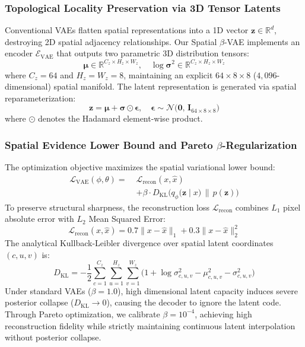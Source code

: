 \documentclass[journal]{IEEEtran}
\begin{document}
\subsubsection{Topological Locality Preservation via 3D Tensor Latents}
Conventional VAEs flatten spatial representations into a 1D vector $\mathbf{z} \in \mathbb{R}^d$, destroying 2D spatial adjacency relationships. Our Spatial $\beta$-VAE implements an encoder $\mathcal{E}_{\text{VAE}}$ that outputs two parametric 3D distribution tensors:
\begin{equation}
\bm{\mu} \in \mathbb{R}^{C_z \times H_z \times W_z}, \quad \log \bm{\sigma}^2 \in \mathbb{R}^{C_z \times H_z \times W_z}
\end{equation}
where $C_z = 64$ and $H_z = W_z = 8$, maintaining an explicit $64 \times 8 \times 8$ ($4,096$-dimensional) spatial manifold. The latent representation is generated via spatial reparameterization:
\begin{equation}
\mathbf{z} = \bm{\mu} + \bm{\sigma} \odot \bm{\epsilon}, \quad \bm{\epsilon} \sim \mathcal{N}\big(\mathbf{0},\, \mathbf{I}_{64 \times 8 \times 8}\big)
\label{eq:spatial_reparam}
\end{equation}
where $\odot$ denotes the Hadamard element-wise product.

\subsubsection{Spatial Evidence Lower Bound and Pareto $\beta$-Regularization}
The optimization objective maximizes the spatial variational lower bound:
\begin{align}
\mathcal{L}_{\text{VAE}}(\phi, \theta) = \;& \mathcal{L}_{\text{recon}}(x, \hat{x}) \nonumber \\
& + \beta \cdot D_{\text{KL}}\Big(q_\phi\big(\mathbf{z} \mid x\big) \,\Big\|\, p(\mathbf{z})\Big)
\label{eq:vae_elbo}
\end{align}
To preserve structural sharpness, the reconstruction loss $\mathcal{L}_{\text{recon}}$ combines $L_1$ pixel absolute error with $L_2$ Mean Squared Error:
\begin{equation}
\mathcal{L}_{\text{recon}}(x, \hat{x}) = 0.7 \|x - \hat{x}\|_1 + 0.3 \|x - \hat{x}\|_2^2
\label{eq:vae_recon}
\end{equation}
The analytical Kullback-Leibler divergence over spatial latent coordinates $(c, u, v)$ is:
\begin{equation}
D_{\text{KL}} = -\frac{1}{2} \sum_{c=1}^{C_z}\sum_{u=1}^{H_z}\sum_{v=1}^{W_z} \Big(1 + \log \sigma_{c,u,v}^2 - \mu_{c,u,v}^2 - \sigma_{c,u,v}^2\Big)
\label{eq:spatial_kl}
\end{equation}
Under standard VAEs ($\beta=1.0$), high dimensional latent capacity induces severe posterior collapse ($D_{\text{KL}} \to 0$), causing the decoder to ignore the latent code. Through Pareto optimization, we calibrate $\beta = 10^{-4}$, achieving high reconstruction fidelity while strictly maintaining continuous latent interpolation without posterior collapse.
\end{document}
